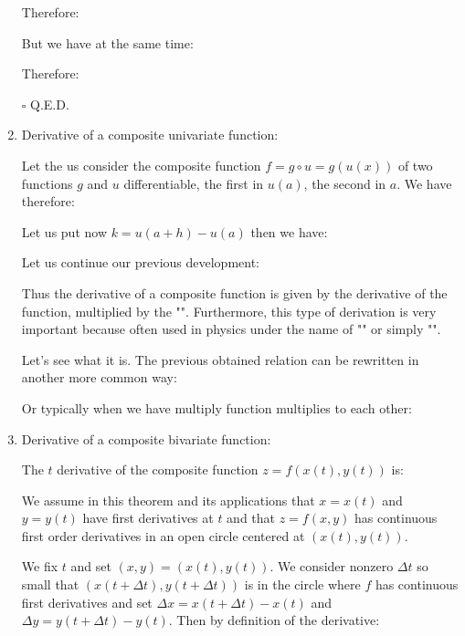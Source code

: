 \begin{enumerate}
\begin{dem}
		 	Therefore:
		 	
		 	But we have at the same time:
		 	
		 	Therefore:
		 	
		 	\begin{flushright}
				$\square$  Q.E.D.
			\end{flushright}
		 \end{dem}
		 \item Derivative of a composite univariate function:
		 
		 Let the us consider the composite function $f=g \circ u=g(u(x))$ of two functions $g$ and $u$ differentiable, the first in $u (a)$, the second in $a$. We have therefore:
		 
		 Let us put now $k=u(a+h)-u(a)$ then we have:
		  
		 Let us continue our previous development:
		  
		 Thus the derivative of a composite function is given by the derivative of the function, multiplied by the "". Furthermore, this type of derivation is very important because often used in physics under the name of "" or simply "".
		 
		 Let's see what it is. The previous obtained relation can be rewritten in another more common way:
		 
		 Or typically when we have multiply function multiplies to each other:
		 
		 
		 \item Derivative of a composite bivariate function:
		 \begin{theorem}
		 The $t$ derivative of the composite function $z=f(x(t),y(t))$ is:
		  
		 We assume in this theorem and its applications that $x=x(t)$ and $y=y(t)$ have first derivatives at $t$ and that $z=f(x,y)$ has continuous first order derivatives in an open circle centered at $(x(t),y(t))$.
		 \end{theorem}
		 \begin{dem}
		 	We fix $t$ and set $(x,y)=(x(t),y(t))$. We consider nonzero $\Delta t$ so small that $(x(t+\Delta t),y(t+\Delta t))$ is in the circle where $f$ has continuous first derivatives and set $\Delta x=x(t+\Delta t)-x(t)$ and $\Delta y=y(t+\Delta t)-y(t)$. Then by definition of the derivative:
		 	

\end{dem}
\end{enumerate}
